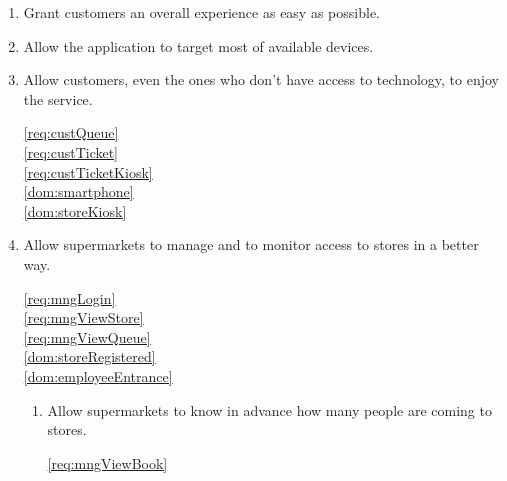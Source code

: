 \begin{enumerate}[label=\textbf{G.\arabic*}]
        \item Grant customers an overall experience as easy as possible.



        \item Allow the application to target most of available devices.


        \item Allow customers, even the ones who don't have access to technology, to enjoy the service.

        \ref{req:custQueue}  ~\\
        \ref{req:custTicket}  ~\\
        \ref{req:custTicketKiosk}  ~\\

        \ref{dom:smartphone}  ~\\
        \ref{dom:storeKiosk}  ~\\



        \item Allow supermarkets to manage and to monitor access to stores in a better way.

        \ref{req:mngLogin}  ~\\
        \ref{req:mngViewStore}  ~\\
        \ref{req:mngViewQueue}  ~\\

        \ref{dom:storeRegistered}  ~\\
        \ref{dom:employeeEntrance}  ~\\

        \begin{enumerate}[label*=\textbf{.\arabic*}]
            \item Allow supermarkets to know in advance how many people are coming to stores.

            \ref{req:mngViewBook}  ~\\


\end{enumerate}
\end{enumerate}
